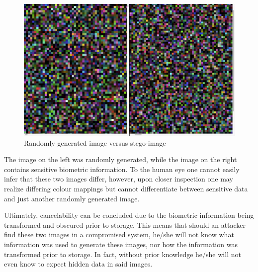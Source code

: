     
    \begin{figure}[htbp!] 
    \centering    
    \includegraphics[width=1.0\textwidth]{Chapter3/Figs/Randomly_generated_image_versus_stego-image.jpg}
    \caption[Randomly generated image versus stego-image]{Randomly generated image versus stego-image}
    \label{fig:Randomly generated image versus stego-image}
    \end{figure}

The image on the left was randomly generated, while the image on the right contains sensitive biometric information. To the human eye one cannot easily infer that these two images differ, however, upon closer inspection one may realize differing colour mappings but cannot differentiate between sensitive data and just another randomly generated image.

Ultimately, cancelability can be concluded due to the biometric information being transformed and obscured prior to storage. This means that should an attacker find these two images in a compromised system, he/she will not know what information was used to generate these images, nor how the information was transformed prior to storage. In fact, without prior knowledge he/she will not even know to expect hidden data in said images.






     
